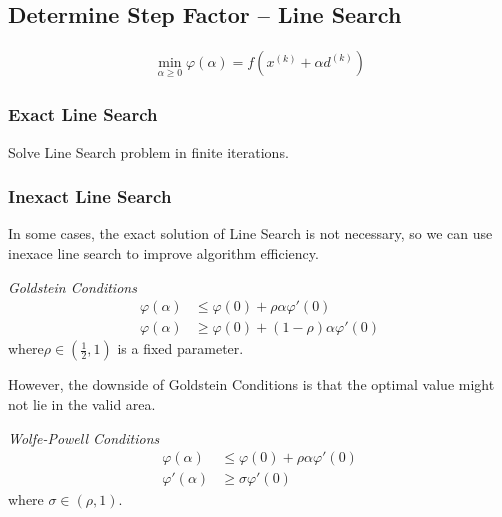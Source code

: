 \subsection{Determine Step Factor -- Line Search}

\begin{align}
    \min_{\alpha \geq 0} \varphi(\alpha) = f(x^{(k)} + \alpha d^{(k)})
\end{align}
\subsubsection{Exact Line Search}
\par
Solve Line Search problem in finite iterations.
\par
\subsubsection{Inexact Line Search}
\par
In some cases, the exact solution of Line Search
is not necessary, so we can use inexace line search
to improve algorithm efficiency.
\par
\noindent\textit{Goldstein Conditions}
\begin{align}
    \varphi(\alpha) &\leq \varphi(0) + \rho\alpha\varphi'(0) \\
    \varphi(\alpha) &\geq \varphi(0) + (1 - \rho)\alpha\varphi'(0)
\end{align}
where$\rho \in (\frac{1}{2}, 1)$ is a fixed parameter.
\par
However, the downside of Goldstein Conditions
is that the optimal value might not lie in
the valid area.
\par\noindent\textit{Wolfe-Powell Conditions}
\begin{align}
    \label{equ:wolfe1}
    \varphi(\alpha) &\leq \varphi(0) + \rho\alpha\varphi'(0) \\
    \varphi'(\alpha) &\geq \sigma\varphi'(0)
    \label{equ:wolfe2}
\end{align}
where $\sigma \in (\rho, 1)$.

